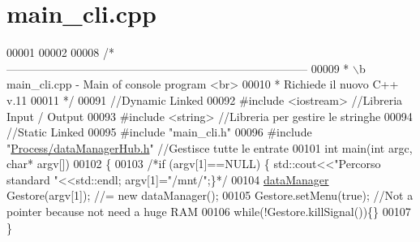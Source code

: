 \hypertarget{main__cli_8cpp_source}{\section{main\-\_\-cli.\-cpp}
}

\begin{DoxyCode}
00001 
00002 
00008 \textcolor{comment}{/*
       --------------------------------------------------------------------------------}
00009 \textcolor{comment}{*   \(\backslash\)b main\_cli.cpp - Main of console program <br>}
00010 \textcolor{comment}{*     Richiede il nuovo C++ v.11}
00011 \textcolor{comment}{*/}
00091 \textcolor{comment}{//Dynamic Linked}
00092 \textcolor{preprocessor}{#include <iostream>}                             \textcolor{comment}{//Libreria Input / Output}
00093 \textcolor{preprocessor}{#include <string>}                                   \textcolor{comment}{//Libreria per gestire le
       stringhe}
00094 \textcolor{comment}{//Static Linked}
00095 \textcolor{preprocessor}{#include "main\_cli.h"}
00096 \textcolor{preprocessor}{#include "\hyperlink{dataManagerHub_8h}{Process/dataManagerHub.h}"} \textcolor{comment}{//Gestisce tutte le entrate}
00101 \textcolor{comment}{}\textcolor{keywordtype}{int} main(\textcolor{keywordtype}{int} argc, \textcolor{keywordtype}{char}* argv[])
00102 \{
00103     \textcolor{comment}{/*if (argv[1]==NULL) \{ std::cout<<"Percorso standard "<<std::endl;
       argv[1]="/mnt/";\}*/}
00104     \hyperlink{classdataManager}{dataManager} Gestore(argv[1]); \textcolor{comment}{//= new dataManager();}
00105     Gestore.setMenu(\textcolor{keyword}{true}); \textcolor{comment}{//Not a pointer because not need a huge RAM}
00106     \textcolor{keywordflow}{while}(!Gestore.killSignal())\{\}
00107 \}
\end{DoxyCode}
